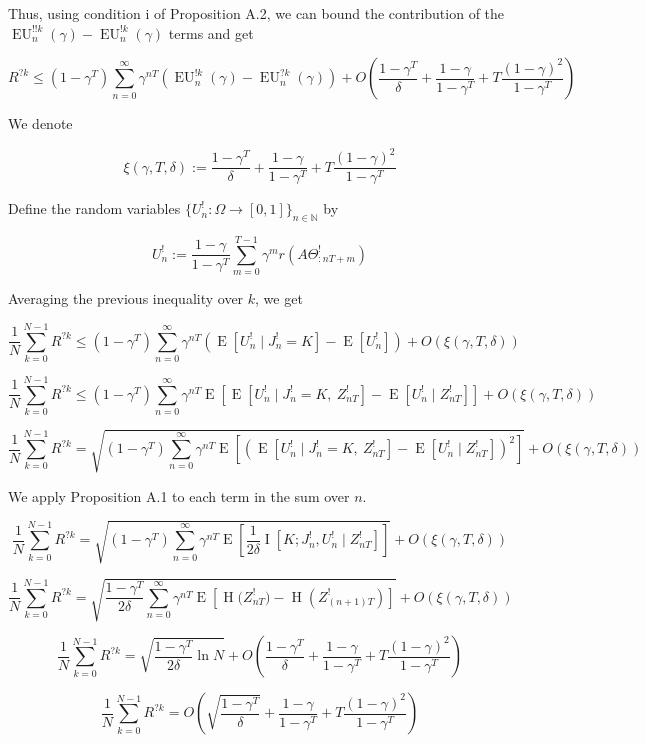 \documentclass[a4paper]{article}
\newcommand{\E}[1]{\underset{#1}{\operatorname{E}}}
\newcommand{\I}[1]{\underset{#1}{\operatorname{I}}}
\newcommand{\En}{\operatorname{H}}
\newcommand{\Nats}{\mathbb{N}}
\newcommand{\Sq}[2]{\{#1\}_{#2 \in \Nats}}
\newcommand{\Sqn}[1]{\Sq{#1}{n}}
\newcommand{\EU}{\operatorname{EU}}
\newcommand{\J}{J}
\begin{document}
Thus, using condition i of Proposition A.2, we can bound the contribution of the $\EU^{!!k}_n(\gamma)-\EU^{!k}_n(\gamma)$ terms and get

$$R^{?k} \leq (1-\gamma^T)\sum_{n=0}^\infty \gamma^{nT} \left(\EU^{!k}_n(\gamma)-\EU^{?k}_n(\gamma)\right) + O\left(\frac{1-\gamma^T}{\delta}+\frac{1-\gamma}{1-\gamma^T}+T\frac{(1-\gamma)^2}{1-\gamma^T}\right)$$

We denote

$$\xi(\gamma,T,\delta):=\frac{1-\gamma^T}{\delta}+\frac{1-\gamma}{1-\gamma^T}+T\frac{(1-\gamma)^2}{1-\gamma^T}$$

Define the random variables $\Sqn{U^!_n : \Omega \rightarrow [0,1]}$ by 

$$U^!_n:=\frac{1-\gamma}{1-\gamma^T}\sum_{m=0}^{T-1} \gamma^{m} r\left(A\Theta^!_{:nT+m}\right)$$

Averaging the previous inequality over $k$, we get

$$\frac{1}{N}\sum_{k=0}^{N-1}R^{?k} \leq (1-\gamma^T)\sum_{n=0}^\infty \gamma^{nT} \left(\E{}\left[U^!_n \mid \J^!_n = K\right]-\E{}\left[U^!_n\right]\right) + O\left(\xi(\gamma,T,\delta)\right)$$

$$\frac{1}{N}\sum_{k=0}^{N-1}R^{?k} \leq (1-\gamma^T)\sum_{n=0}^\infty \gamma^{nT} \E{}\left[\E{}\left[U^!_n \mid \J^!_n = K,\ Z^!_{nT}\right]-\E{}\left[U^!_n \mid Z^!_{nT}\right]\right] + O\left(\xi(\gamma,T,\delta)\right)$$

$$\frac{1}{N}\sum_{k=0}^{N-1}R^{?k} = \sqrt{(1-\gamma^T)\sum_{n=0}^\infty \gamma^{nT} \E{}\left[\left(\E{}\left[U^!_n \mid \J^!_n = K,\ Z^!_{nT}\right]-\E{}\left[U^!_n \mid Z^!_{nT}\right]\right)^2\right]} + O\left(\xi(\gamma,T,\delta)\right)$$

We apply Proposition A.1 to each term in the sum over $n$.

$$\frac{1}{N}\sum_{k=0}^{N-1}R^{?k} = \sqrt{(1-\gamma^T)\sum_{n=0}^\infty \gamma^{nT} \E{}\left[\frac{1}{2\delta}\I{}\left[K;\J^!_n,U^!_n \mid Z^!_{nT}\right]\right]} + O\left(\xi(\gamma,T,\delta)\right)$$

$$\frac{1}{N}\sum_{k=0}^{N-1}R^{?k} = \sqrt{\frac{1-\gamma^T}{2\delta}\sum_{n=0}^\infty \gamma^{nT} \E{}\left[\En\Big(Z^!_{nT}\Big)-\En\left(Z^!_{(n+1)T}\right)\right]} + O\left(\xi(\gamma,T,\delta)\right)$$

$$\frac{1}{N}\sum_{k=0}^{N-1}R^{?k} = \sqrt{\frac{1-\gamma^T}{2\delta}\ln N} + O\left(\frac{1-\gamma^T}{\delta}+\frac{1-\gamma}{1-\gamma^T}+T\frac{(1-\gamma)^2}{1-\gamma^T}\right)$$

$$\frac{1}{N}\sum_{k=0}^{N-1}R^{?k} = O\left(\sqrt{\frac{1-\gamma^T}{\delta}} +\frac{1-\gamma}{1-\gamma^T}+T\frac{(1-\gamma)^2}{1-\gamma^T}\right)$$
\end{document}
